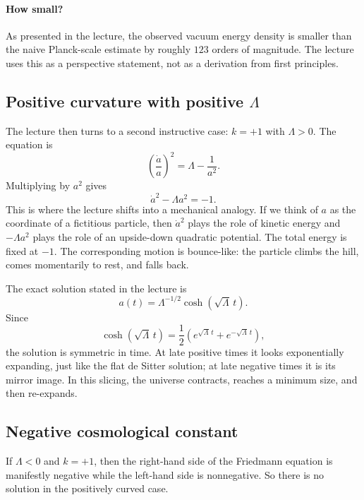 \paragraph{How small?} As presented in the lecture, the observed vacuum energy density is smaller than the naive Planck-scale estimate by roughly \(123\) orders of magnitude. The lecture uses this as a perspective statement, not as a derivation from first principles.

\subsection{Positive curvature with positive \(\Lambda\)}

The lecture then turns to a second instructive case: \(k=+1\) with \(\Lambda>0\). The equation is
\begin{equation}
\left(\frac{\dot a}{a}\right)^2=\Lambda-\frac{1}{a^2}.
\end{equation}
Multiplying by \(a^2\) gives
\begin{equation}
\dot a^2-\Lambda a^2=-1.
\end{equation}
This is where the lecture shifts into a mechanical analogy. If we think of \(a\) as the coordinate of a fictitious particle, then \(\dot a^2\) plays the role of kinetic energy and \(-\Lambda a^2\) plays the role of an upside-down quadratic potential. The total energy is fixed at \(-1\). The corresponding motion is bounce-like: the particle climbs the hill, comes momentarily to rest, and falls back.

The exact solution stated in the lecture is
\begin{equation}
a(t)=\Lambda^{-1/2}\cosh(\sqrt{\Lambda}\,t).
\end{equation}
Since
\begin{equation}
\cosh(\sqrt{\Lambda}\,t)=\frac12\left(e^{\sqrt{\Lambda}\,t}+e^{-\sqrt{\Lambda}\,t}\right),
\end{equation}
the solution is symmetric in time. At late positive times it looks exponentially expanding, just like the flat de Sitter solution; at late negative times it is its mirror image. In this slicing, the universe contracts, reaches a minimum size, and then re-expands.

\subsection{Negative cosmological constant}

If \(\Lambda<0\) and \(k=+1\), then the right-hand side of the Friedmann equation is manifestly negative while the left-hand side is nonnegative. So there is no solution in the positively curved case.

